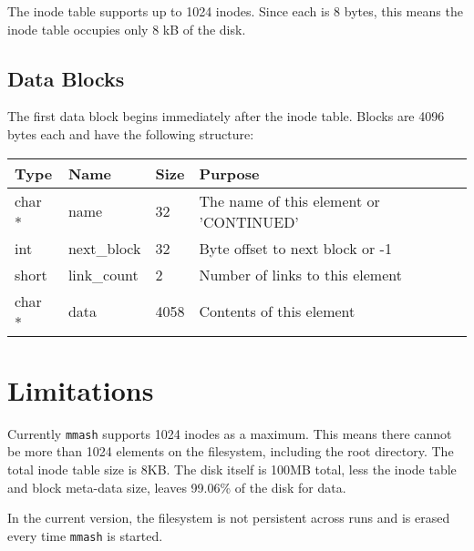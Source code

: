 \documentclass[]{article}
\begin{document}
The inode table supports up to 1024 inodes. Since each is 8 bytes, this means the inode table occupies only 8 kB of the disk.

\subsection{Data Blocks}
The first data block begins immediately after the inode table. Blocks are 4096 bytes each and have the following structure:

\begin{table}[h]
	\begin{tabular}{llll}
		Type   & Name        & Size & Purpose                                 \\ \hline
		char * & name        & 32   & The name of this element or 'CONTINUED' \\
		int    & next\_block & 32   & Byte offset to next block or -1         \\
		short  & link\_count & 2    & Number of links to this element         \\
		char * & data        & 4058 & Contents of this element               
	\end{tabular}
\end{table}


\section{Limitations}

Currently \texttt{mmash} supports 1024 inodes as a maximum. This means there cannot be more than 1024 elements on the filesystem, including the root directory. The total inode table size is 8KB. The disk itself is 100MB total, less the inode table and block meta-data size, leaves 99.06\% of the disk for data. 

In the current version, the filesystem is not persistent across runs and is erased every time \texttt{mmash} is started. 
\end{document}
